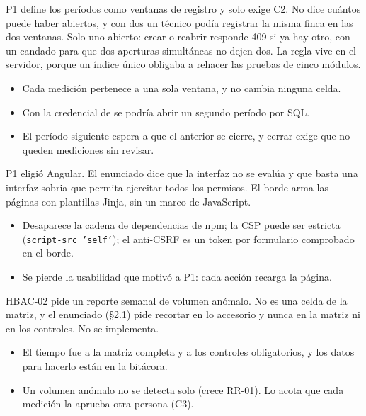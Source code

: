 \documentclass[11pt,a4paper]{article}
\theoremstyle{definition}
\theoremstyle{remark}
\newcommand{\code}[1]{\texttt{#1}}
\begin{document}
\adrctx P1 define los períodos como ventanas de registro y solo exige C2. No
dice cuántos puede haber abiertos, y con dos un técnico podía registrar la
misma finca en las dos ventanas.
\adrdec Solo uno abierto: crear o reabrir responde 409 si ya hay otro, con un
candado para que dos aperturas simultáneas no dejen dos. La regla vive en el
servidor, porque un índice único obligaba a rehacer las pruebas de cinco
módulos.
\adrpos
\begin{itemize}
  \item Cada medición pertenece a una sola ventana, y no cambia ninguna celda.
\end{itemize}
\adrneg
\begin{itemize}
  \item Con la credencial de  se podría abrir un segundo período
    por SQL.
  \item El período siguiente espera a que el anterior se cierre, y cerrar
    exige que no queden mediciones sin revisar.
\end{itemize}

\adrctx P1 eligió Angular. El enunciado dice que la interfaz no se evalúa y que
basta una interfaz sobria que permita ejercitar todos los permisos.
\adrdec El borde arma las páginas con plantillas Jinja, sin un marco de
JavaScript.
\adrpos
\begin{itemize}
  \item Desaparece la cadena de dependencias de npm; la CSP puede ser estricta
    (\code{script-src 'self'}); el anti-CSRF es un token por formulario
    comprobado en el borde.
\end{itemize}
\adrneg
\begin{itemize}
  \item Se pierde la usabilidad que motivó a P1: cada acción recarga la página.
\end{itemize}

\adrctx HBAC-02 pide un reporte semanal de volumen anómalo. No es una celda de
la matriz, y el enunciado (§2.1) pide recortar en lo accesorio y nunca en la
matriz ni en los controles.
\adrdec No se implementa.
\adrpos
\begin{itemize}
  \item El tiempo fue a la matriz completa y a los controles obligatorios, y
    los datos para hacerlo están en la bitácora.
\end{itemize}
\adrneg
\begin{itemize}
  \item Un volumen anómalo no se detecta solo (crece RR-01). Lo acota que cada
    medición la aprueba otra persona (C3).
\end{itemize}
\end{document}
